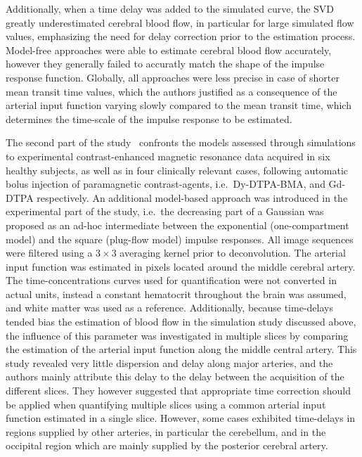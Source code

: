 Additionally, when a time delay was added to the simulated curve, the SVD greatly underestimated cerebral blood flow, in particular for large simulated flow values, emphasizing the need for delay correction prior to the estimation process.
Model-free approaches were able to estimate cerebral blood flow accurately, however they generally failed to accuratly match the shape of the impulse response function.
Globally, all approaches were less precise in case of shorter mean transit time values, which the authors justified as a consequence of the arterial input function varying slowly compared to the mean transit time, which determines the time-scale of the impulse response to be estimated.

The second part of the study~\cite{ostergaard:1996hh} confronts the models assessed through simulations to experimental contrast-enhanced magnetic resonance data acquired in six healthy subjects, as well as in four clinically relevant cases, following automatic bolus injection of paramagnetic contrast-agents, i.e.~Dy-DTPA-BMA, and Gd-DTPA respectively.
An additional model-based approach was introduced in the experimental part of the study, i.e.~the decreasing part of a Gaussian was proposed as an ad-hoc intermediate between the exponential (one-compartment model) and the square (plug-flow model) impulse responses. 
All image sequences were filtered using a $3 \times 3$ averaging kernel prior to deconvolution.
The arterial input function was estimated in pixels located around the middle cerebral artery.
The time-concentrations curves used for quantification were not converted in actual units, instead a constant hematocrit throughout the brain was assumed, and white matter was used as a reference.
Additionally, because time-delays tended bias the estimation of blood flow in the simulation study discussed above, the influence of this parameter was investigated in multiple slices by comparing the estimation of the arterial input function along the middle central artery.
This study revealed very little dispersion and delay along major arteries, and the authors mainly attribute this delay to the delay between the acquisition of the different slices.
They however suggested that appropriate time correction should be applied when quantifying multiple slices using a common arterial input function estimated in a single slice.
However, some cases exhibited time-delays in regions supplied by other arteries, in particular the cerebellum, and in the occipital region which are mainly supplied by the posterior cerebral artery.
